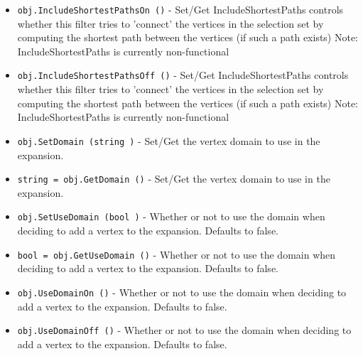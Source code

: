\begin{itemize}
\item  \verb|obj.IncludeShortestPathsOn ()| -  Set/Get IncludeShortestPaths controls whether this filter tries to 
 'connect' the vertices in the selection set by computing the
 shortest path between the vertices (if such a path exists)
 Note: IncludeShortestPaths is currently non-functional

\item  \verb|obj.IncludeShortestPathsOff ()| -  Set/Get IncludeShortestPaths controls whether this filter tries to 
 'connect' the vertices in the selection set by computing the
 shortest path between the vertices (if such a path exists)
 Note: IncludeShortestPaths is currently non-functional

\item  \verb|obj.SetDomain (string )| -  Set/Get the vertex domain to use in the expansion.

\item  \verb|string = obj.GetDomain ()| -  Set/Get the vertex domain to use in the expansion.

\item  \verb|obj.SetUseDomain (bool )| -  Whether or not to use the domain when deciding to add a vertex to the 
 expansion. Defaults to false. 

\item  \verb|bool = obj.GetUseDomain ()| -  Whether or not to use the domain when deciding to add a vertex to the 
 expansion. Defaults to false. 

\item  \verb|obj.UseDomainOn ()| -  Whether or not to use the domain when deciding to add a vertex to the 
 expansion. Defaults to false. 

\item  \verb|obj.UseDomainOff ()| -  Whether or not to use the domain when deciding to add a vertex to the 
 expansion. Defaults to false. 

\end{itemize}
